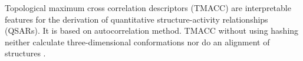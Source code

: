 Topological maximum cross correlation descriptors (TMACC) are interpretable features for the derivation of quantitative structure-activity relationships (QSARs). It is based on autocorrelation method. TMACC without using hashing  neither calculate three-dimensional conformations nor do an alignment of structures \cite{Melville_2007}.